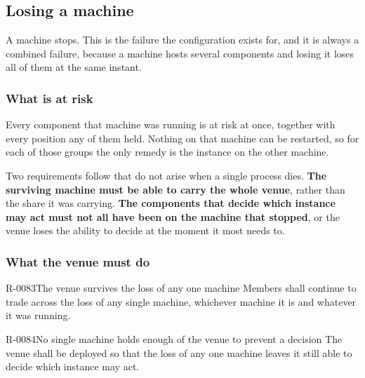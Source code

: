 \subsection{Losing a machine}
\label{sec:ha:enabled:machine_loss}

A machine stops. This is the failure the configuration exists for, and it is
always a combined failure, because a machine hosts several components and losing
it loses all of them at the same instant.

\subsubsection{What is at risk}
\label{sec:ha:enabled:machine_loss:risk}

Every component that machine was running is at risk at once, together with every
position any of them held. Nothing on that machine can be restarted, so for each
of those groups the only remedy is the instance on the other machine.

Two requirements follow that do not arise when a single process dies.
\textbf{The surviving machine must be able to carry the whole venue}, rather than
the share it was carrying. \textbf{The components that decide which instance may
act must not all have been on the machine that stopped}, or the venue loses the
ability to decide at the moment it most needs to.

\subsubsection{What the venue must do}
\label{sec:ha:enabled:machine_loss:behaviour}

\begin{requirement}{R-0083}{The venue survives the loss of any one machine}
  Members shall continue to trade across the loss of any single machine,
  whichever machine it is and whatever it was running.
\end{requirement}

\begin{requirement}{R-0084}{No single machine holds enough of the venue to prevent a decision}
  The venue shall be deployed so that the loss of any one machine leaves it
  still able to decide which instance may act.
\end{requirement}

